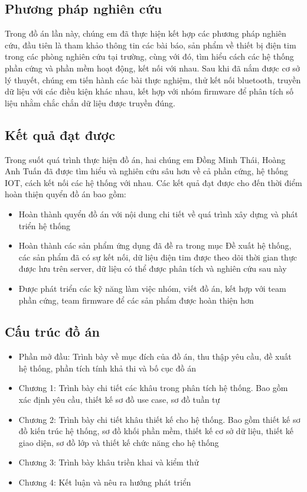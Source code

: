 \subsection*{Phương pháp nghiên cứu}
Trong đồ án lần này, chúng em đã thực hiện kết hợp các phương pháp nghiên cứu, đầu tiên là tham khảo thông tin các bài
báo, sản phẩm về thiết bị điện tim trong các phòng nghiên cứu tại trường, cùng với đó, tìm hiểu cách các hệ thống phần cứng và phần mềm hoạt động,
kết nối với nhau. Sau khi đã nắm được cơ sở lý thuyết, chúng em tiến hành các bài thực nghiệm, thử kết nối bluetooth, truyền dữ liệu với các điều kiện khác nhau,
kết hợp với nhóm firmware để phân tích số liệu nhằm chắc chắn dữ liệu được truyền đúng.

\subsection*{Kết quả đạt được}

Trong suốt quá trình thực hiện đồ án, hai chúng em Đồng Minh Thái, Hoàng Anh Tuấn đã được tìm hiểu và nghiên cứu sâu hơn về cả phần cứng,
hệ thống IOT, cách kết nối các hệ thống với nhau. Các kết quả đạt được cho đến thời điểm hoàn thiện quyển đồ án bao gồm:

\begin{itemize}
  \item Hoàn thành quyển đồ án với nội dung chi tiết về quá trình xây dựng và phát triển hệ thống
  \item Hoàn thành các sản phẩm ứng dụng đã đề ra trong mục Đề xuất hệ thống, các sản phẩm đã có sự kết nối, dữ liệu điện tim được theo dõi
  thời gian thực được lưu trên server, dữ liệu có thể được phân tích và nghiên cứu sau này
  \item Được phát triển các kỹ năng làm việc nhóm, viết đồ án, kết hợp với team phần cứng, team firmware để các sản phẩm được hoàn thiện hơn
\end{itemize}

\subsection*{Cấu trúc đồ án}
\begin{itemize}
  \item Phần mở đầu: Trình bày về mục đích của đồ án, thu thập yêu cầu, đề xuất hệ thống, phần tích tính khả thi và bố cục đồ án
  \item Chương 1: Trình bày chi tiết các khâu trong phân tích hệ thống. Bao gồm xác định yêu cầu, thiết kế sơ đồ use case, sơ đồ tuần tự
  \item Chương 2: Trình bày chi tiết khâu thiết kế cho hệ thống. Bao gồm thiết kế sơ đồ kiến trúc hệ thống, sơ đồ khối
  phần mềm, thiết kế cơ sở dữ liệu, thiết kế giao diện, sơ đồ lớp và thiết kế chức năng cho hệ thống
  \item Chương 3: Trình bày khâu triền khai và kiểm thử
  \item Chương 4: Kết luận và nêu ra hướng phát triển
\end{itemize}

\cleardoublepage

